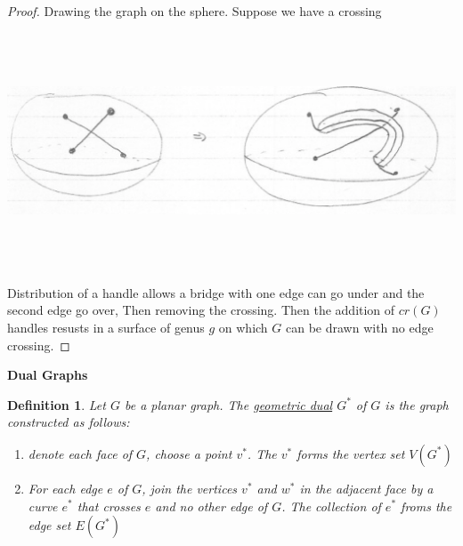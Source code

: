 \documentclass[12pt]{article}
\newtheorem{definition}{Definition}
\begin{document}
\begin{proof}
	Drawing the graph on the sphere. Suppose we have a crossing

	\begin{center}
		\includegraphics[width=15cm, height=7cm]{crossingproof}
	\end{center}

	Distribution of a handle allows a bridge with one edge can go under and the second edge go over,
	Then removing the crossing. Then the addition of $cr(G)$ handles resusts in a surface of genus $g$ on which $G$ can be drawn with no edge crossing.

\end{proof}


\textbf{Dual Graphs}

\begin{definition}
	Let $G$ be a planar graph. The \underline{geometric dual} $G^{*}$ of $G$ is the graph constructed as follows:
	\begin{enumerate}
		\item denote each face of $G$, choose a point $v^{*}$. The $v^{*}$ forms the vertex set $V(G^{*})$
		\item For each edge $e$ of $G$, join the vertices $v^{*}$ and $w^{*}$ in the adjacent face by a curve $e^{*}$ that crosses $e$ and no other edge of $G$. The collection of $e^{*}$ froms the edge set $E(G^{*})$
	\end{enumerate}

\end{definition}
\end{document}

